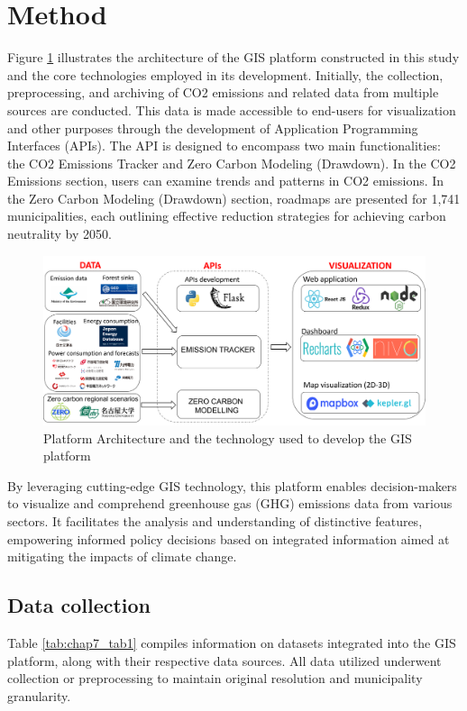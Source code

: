\section{Method}
Figure \ref{fig:chap7_fig1} illustrates the architecture of the GIS platform constructed in this study and the core technologies employed in its development. Initially, the collection, preprocessing, and archiving of CO2 emissions and related data from multiple sources are conducted. This data is made accessible to end-users for visualization and other purposes through the development of Application Programming Interfaces (APIs). The API is designed to encompass two main functionalities: the CO2 Emissions Tracker and Zero Carbon Modeling (Drawdown). In the CO2 Emissions section, users can examine trends and patterns in CO2 emissions. In the Zero Carbon Modeling (Drawdown) section, roadmaps are presented for 1,741 municipalities, each outlining effective reduction strategies for achieving carbon neutrality by 2050.\par
\begin{figure}
  \centering
  \includegraphics[width=\textwidth]{figs/chap7/platform_architecture.png}
  \caption[Platform architecture]{Platform Architecture and the technology used to develop the GIS platform}
  \label{fig:chap7_fig1}
\end{figure}

By leveraging cutting-edge GIS technology, this platform enables decision-makers to visualize and comprehend greenhouse gas (GHG) emissions data from various sectors. It facilitates the analysis and understanding of distinctive features, empowering informed policy decisions based on integrated information aimed at mitigating the impacts of climate change. \par
\subsection{Data collection}
Table \ref{tab:chap7_tab1} compiles information on datasets integrated into the GIS platform, along with their respective data sources. All data utilized underwent collection or preprocessing to maintain original resolution and municipality granularity. \par

